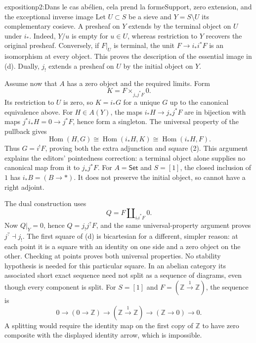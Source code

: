 \begin{dcomment}{exposition}{p2:Dans le cas abélien, cela prend la forme}{Support, zero extension, and the exceptional inverse image}
Let $U\subset S$ be a sieve and $Y=S\setminus U$ its complementary cosieve. A presheaf on $Y$ extends by the terminal object on $U$ under $i_*$. Indeed, $Y/u$ is empty for $u\in U$, whereas restriction to $Y$ recovers the original presheaf. Conversely, if $F|_U$ is terminal, the unit $F\to i_*i^*F$ is an isomorphism at every object. This proves the description of the essential image in (d). Dually, $j_!$ extends a presheaf on $U$ by the initial object on $Y$.

Assume now that $A$ has a zero object and the required limits. Form
\[
 K=F\times_{j_*j^*F}0.
\]
Its restriction to $U$ is zero, so $K=i_*G$ for a unique $G$ up to the canonical equivalence above. For $H\in A(Y)$, the maps $i_*H\to j_*j^*F$ are in bijection with maps $j^*i_*H=0\to j^*F$, hence form a singleton. The universal property of the pullback gives
\[
 \operatorname{Hom}(H,G)\cong\operatorname{Hom}(i_*H,K)
 \cong\operatorname{Hom}(i_*H,F).
\]
Thus $G=i^!F$, proving both the extra adjunction and square (2). This argument explains the editors' pointedness correction: a terminal object alone supplies no canonical map from it to $j_*j^*F$. For $A=\mathsf{Set}$ and $S=[1]$, the closed inclusion of $1$ has $i_*B=(B\to *)$. It does not preserve the initial object, so cannot have a right adjoint.

The dual construction uses
\[
 Q=F\amalg_{i_!i^*F}0.
\]
Now $Q|_Y=0$, hence $Q=j_!j^?F$, and the same universal-property argument proves $j^?\dashv j_!$. The first square of (d) is bicartesian for a different, simpler reason: at each point it is a square with an identity on one side and a zero object on the other. Checking at points proves both universal properties. No stability hypothesis is needed for this particular square. In an abelian category its associated short exact sequence need not split as a sequence of diagrams, even though every component is split. For $S=[1]$ and $F=(\mathbb Z\xrightarrow{1}\mathbb Z)$, the sequence is
\[
 0\longrightarrow(0\to\mathbb Z)\longrightarrow
 (\mathbb Z\xrightarrow{1}\mathbb Z)\longrightarrow
 (\mathbb Z\to0)\longrightarrow0.
\]
A splitting would require the identity map on the first copy of $\mathbb Z$ to have zero composite with the displayed identity arrow, which is impossible.
\end{dcomment}


